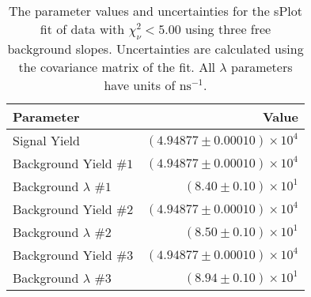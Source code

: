 
\begin{table}[ht]
    \begin{center}
        \begin{tabular}{lr}\toprule
            Parameter & Value \\\midrule
            Signal Yield & $(4.94877 \pm 0.00010) \times 10^{4}$ \\
            Background Yield $\#1$ & $(4.94877 \pm 0.00010) \times 10^{4}$ \\
            Background $\lambda$ $\#1$ & $(8.40 \pm 0.10) \times 10^{1}$ \\
            Background Yield $\#2$ & $(4.94877 \pm 0.00010) \times 10^{4}$ \\
            Background $\lambda$ $\#2$ & $(8.50 \pm 0.10) \times 10^{1}$ \\
            Background Yield $\#3$ & $(4.94877 \pm 0.00010) \times 10^{4}$ \\
            Background $\lambda$ $\#3$ & $(8.94 \pm 0.10) \times 10^{1}$ \\\bottomrule
        \end{tabular}
        \caption{The parameter values and uncertainties for the sPlot fit of data with $\chi^2_\nu < 5.00$ using three free background slopes. Uncertainties are calculated using the covariance matrix of the fit. All $\lambda$ parameters have units of $\si{\nano\second}^{-1}$.}\label{tab:splot-fit-results-chisqdof-5.00-free-3}
    \end{center}
\end{table}
